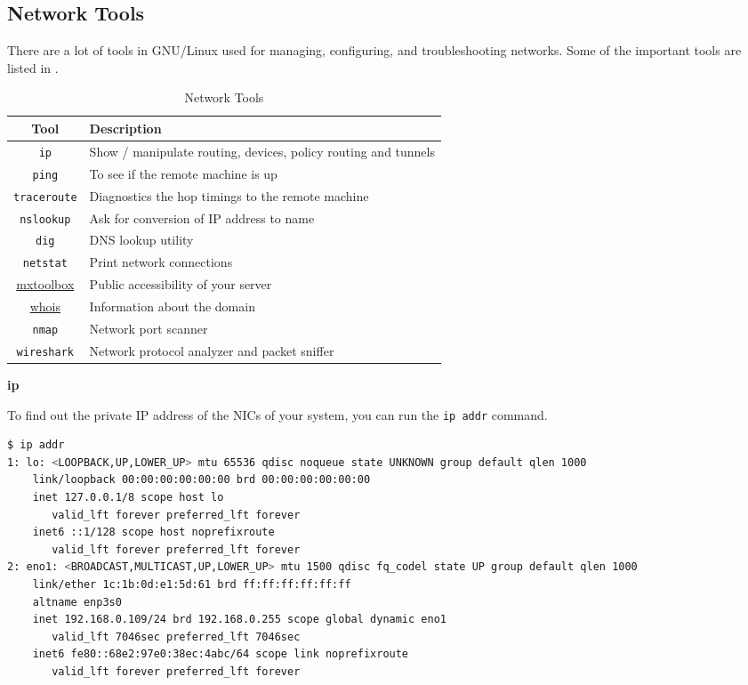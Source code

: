 \subsection{Network Tools}

There are a lot of tools in GNU/Linux used for managing,
configuring, and troubleshooting networks. Some of the
important tools are listed in .

\begin{table}[h!]
  \caption{Network Tools}
  \begin{tabular}{c l}
    \toprule
    \textbf{Tool} & \textbf{Description} \\
    \midrule
    \lstinline|ip| & Show / manipulate routing, devices, policy routing and tunnels \\
    \lstinline|ping| & To see if the remote machine is up \\
    \lstinline|traceroute| & Diagnostics the hop timings to the remote machine \\
    \lstinline|nslookup| & Ask for conversion of IP address to name \\
    \lstinline|dig| & DNS lookup utility \\
    \lstinline|netstat| & Print network connections \\
    \href{https://mxtoolbox.com/}{mxtoolbox} & Public accessibility of your server \\
    \href{https://whois.com/}{whois} & Information about the domain \\
    \lstinline|nmap| & Network port scanner \\
    \lstinline|wireshark| & Network protocol analyzer and packet sniffer \\
    \bottomrule
  \end{tabular}
\end{table}

\textbf{ip}

To find out the private IP address of the NICs of your system,
you can run the \lstinline|ip addr| command.

\begin{lstlisting}[language=bash]
$ ip addr
1: lo: <LOOPBACK,UP,LOWER_UP> mtu 65536 qdisc noqueue state UNKNOWN group default qlen 1000
    link/loopback 00:00:00:00:00:00 brd 00:00:00:00:00:00
    inet 127.0.0.1/8 scope host lo
       valid_lft forever preferred_lft forever
    inet6 ::1/128 scope host noprefixroute
       valid_lft forever preferred_lft forever
2: eno1: <BROADCAST,MULTICAST,UP,LOWER_UP> mtu 1500 qdisc fq_codel state UP group default qlen 1000
    link/ether 1c:1b:0d:e1:5d:61 brd ff:ff:ff:ff:ff:ff
    altname enp3s0
    inet 192.168.0.109/24 brd 192.168.0.255 scope global dynamic eno1
       valid_lft 7046sec preferred_lft 7046sec
    inet6 fe80::68e2:97e0:38ec:4abc/64 scope link noprefixroute
       valid_lft forever preferred_lft forever
\end{lstlisting}

